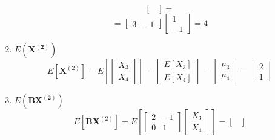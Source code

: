 \begin{enumerate}[label=(\alph*)]
\[\begin{bmatrix}
                \end{bmatrix}
                =
            \]
            \[
                =
                \begin{bmatrix}
                    3 & -1
                \end{bmatrix}
                \begin{bmatrix}
                    1 \\
                    -1
                \end{bmatrix}
                = 4
            \]
            \item $E\left(\mathbf{X^{(2)}}\right)$
            \[
                E\left[\mathbf{X}^{(2)}\right]
                = 
                E\left[
                    \begin{bmatrix}
                        X_3 \\
                        X_4
                    \end{bmatrix}
                \right]
                =
                \begin{bmatrix}
                    E[X_3] \\
                    E[X_4]
                \end{bmatrix}
                =
                \begin{bmatrix}
                    \mu_3 \\
                    \mu_4
                \end{bmatrix}
                =\begin{bmatrix}
                    2 \\
                    1
                \end{bmatrix}
            \]
            \item $E\left(\mathbf{B}\mathbf{X^{(2)}}\right)$
            \[
                E\left[\mathbf{B}\mathbf{X}^{(2)}\right]
                =
                E\left[
                    \begin{bmatrix}
                        2 & -1 \\
                        0 & 1
                    \end{bmatrix}
                    \begin{bmatrix}
                        X_3 \\
                        X_4
                    \end{bmatrix}
                \right]
                =
                \begin{bmatrix}

\end{bmatrix}\]
\end{enumerate}
